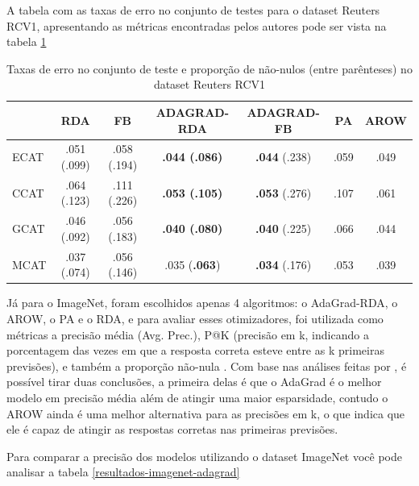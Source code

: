 A tabela com as taxas de erro no conjunto de testes para o dataset Reuters RCV1, apresentando as métricas encontradas pelos autores pode ser vista na tabela \ref{tab:resultados-rcv1-adagrad}

\begin{table}[htbp]
    \centering
    \caption{Taxas de erro no conjunto de teste e proporção de não-nulos (entre parênteses) no dataset Reuters RCV1}
    \label{tab:resultados-rcv1-adagrad}
    \begin{tabular}{l c c c c c c}
        \toprule
         & RDA & FB & ADAGRAD-RDA & ADAGRAD-FB & PA & AROW \\
        \midrule
        ECAT & .051 (.099) & .058 (.194) & \textbf{.044 (.086)} & \textbf{.044} (.238) & .059 & .049 \\
        CCAT & .064 (.123) & .111 (.226) & \textbf{.053 (.105)} & \textbf{.053} (.276) & .107 & .061 \\
        GCAT & .046 (.092) & .056 (.183) & \textbf{.040 (.080)} & \textbf{.040} (.225) & .066 & .044 \\
        MCAT & .037 (.074) & .056 (.146) & .035 (\textbf{.063}) & \textbf{.034} (.176) & .053 & .039 \\
        \bottomrule
    \end{tabular}
\end{table}

Já para o ImageNet, foram escolhidos apenas 4 algoritmos: o AdaGrad-RDA, o AROW, o PA e o RDA, e para avaliar esses otimizadores, foi utilizada como métricas a precisão média (Avg. Prec.), P@K (precisão em k, indicando a porcentagem das vezes em que a resposta correta esteve entre as k primeiras previsões), e também a proporção não-nula \parencite{AdaGradMethod}. Com base nas análises feitas por \textcite{AdaGradMethod}, é possível tirar duas conclusões, a primeira delas é que o AdaGrad é o melhor modelo em precisão média além de atingir uma maior esparsidade, contudo o AROW ainda é uma melhor alternativa para as precisões em k, o que indica que ele é capaz de atingir as respostas corretas nas primeiras previsões.

Para comparar a precisão dos modelos utilizando o dataset ImageNet você pode analisar a tabela \ref{resultados-imagenet-adagrad}

